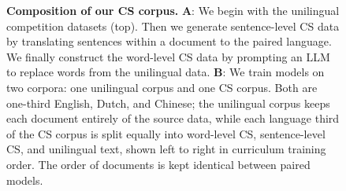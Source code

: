 \begin{figure}[t!]
\caption{\textbf{Composition of our CS corpus.}
\textbf{A}: We begin with the unilingual competition datasets (top).
Then we generate sentence-level CS data by translating sentences within a document to the paired language.
We finally construct the word-level CS data by prompting an LLM to replace words from the unilingual data.
\textbf{B}: We train models on two corpora: one unilingual corpus and one CS corpus. Both are one-third English, Dutch, and Chinese; the unilingual corpus keeps each document entirely of the source data, while each language third of the CS corpus is split equally into word-level CS, sentence-level CS, and unilingual text, shown left to right in curriculum training order. The order of documents is kept identical between paired models.}
\label{fig:overview}
\end{figure}
